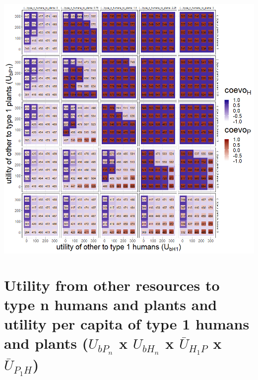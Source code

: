 \documentclass[
]{book}
\begin{document}
\newpage

\includegraphics[width=1\linewidth]{plots/4_exp_utility_boundaries-tripleRaster_fourParameterss}

\newpage

\hypertarget{utility-from-other-resources-to-type-n-humans-and-plants-and-utility-per-capita-of-type-1-humans-and-plants-u_bp_n-x-u_bh_n-x-baru_h_1p-x-baru_p_1h}{%
\section{\texorpdfstring{Utility from other resources to type n humans and plants and utility per capita of type 1 humans and plants (\(U_{bP_{n}}\) x \(U_{bH_{n}}\) x \(\bar{U}_{H_{1}P}\) x \(\bar{U}_{P_{1}H}\))}{Utility from other resources to type n humans and plants and utility per capita of type 1 humans and plants (U\_\{bP\_\{n\}\} x U\_\{bH\_\{n\}\} x \textbackslash bar\{U\}\_\{H\_\{1\}P\} x \textbackslash bar\{U\}\_\{P\_\{1\}H\})}}\label{utility-from-other-resources-to-type-n-humans-and-plants-and-utility-per-capita-of-type-1-humans-and-plants-u_bp_n-x-u_bh_n-x-baru_h_1p-x-baru_p_1h}}

\end{document}
